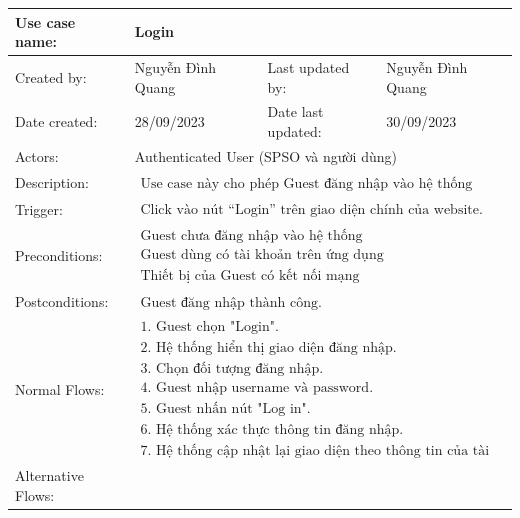 \begin{tabular}{|l|l|l|l|}
\hline Use case name: & \multicolumn{3}{|l|}{Login} \\
\hline Created by: & Nguyễn Đình Quang & Last updated by: &  Nguyễn Đình Quang \\
\hline Date created: & 28/09/2023 & Date last updated: & 30/09/2023\\
\hline Actors: & \multicolumn{3}{|l|}{ Authenticated User (SPSO và người dùng) } \\
\hline Description: & \multicolumn{3}{|l|}{$\begin{array}{l}\text{Use case này cho phép Guest đăng nhập vào hệ thống } \end{array}$} \\

\hline Trigger: & \multicolumn{3}{|l|}{$\begin{array}{l}\text{Click vào nút “Login” trên giao diện chính của website.} \end{array}$} \\
\hline Preconditions: & \multicolumn{3}{|l|}{$\begin{array}{l}\text {Guest chưa đăng nhập vào hệ thống} \\ \text{Guest dùng có tài khoản trên ứng dụng} \\ \text{Thiết bị của Guest có kết nối mạng} \end{array}$} \\
\hline Postconditions: & \multicolumn{3}{|l|}{$\begin{array}{l}\text {Guest đăng nhập thành công.} \end{array}$} \\
\hline Normal Flows: & \multicolumn{3}{|l|}{$\begin{array}{l}\text {1. Guest chọn "Login". } \\
\text {2. Hệ thống hiển thị giao diện đăng nhập. } \\
\text {3. Chọn đối tượng đăng nhập. } \\
\text {4. Guest nhập username và password. } \\
\text {5. Guest nhấn nút "Log in".  } \\
\text {6. Hệ thống xác thực thông tin đăng nhập. } \\
\text {7. Hệ thống cập nhật lại giao diện theo thông tin của tài khoản Guest. }\end{array}$} \\
\hline  Alternative Flows: & \multicolumn{3}{|l|}{} \\

\end{tabular}
